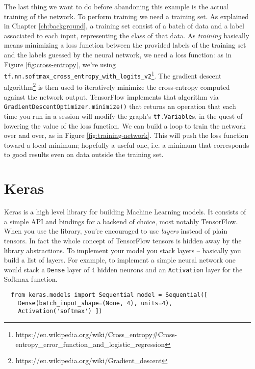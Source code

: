 The last thing we want to do before abandoning this example is the
actual training of the network. To perform training we need a training
set. As explained in Chapter \ref{ch:background}, a training set
consist of a batch of data and a label associated to each input,
representing the class of that data. As \emph{training} basically means
minimizing a loss function between the provided labels of the training
set and the labels guessed by the neural network, we need a loss
function: as in Figure \ref{fig:cross-entropy}, we're using
\texttt{tf.nn.softmax\_cross\_entropy\_with\_logits\_v2}\footnote{https://en.wikipedia.org/wiki/Cross\_entropy\#Cross-entropy\_error\_function\_and\_logistic\_regression}.
The gradient descent
algorithm\footnote{https://en.wikipedia.org/wiki/Gradient\_descent} is
then used to iteratively minimize the cross-entropy computed against
the network output. TensorFlow implements that algorithm via
\texttt{GradientDescentOptimizer.minimize()} that returns an operation
that each time you run in a session will modify the graph's
\texttt{tf.Variable}s, in the quest of lowering the value of the loss
function. We can build a loop to train the network over and over, as in
Figure \ref{fig:training-network}. This will push the loss function
toward a local minimum; hopefully a useful one, i.e. a minimum that
corresponds to good results even on data outside the training set.

\section{Keras}
\label{sec:keras}

Keras is a high level library for building Machine Learning
models. It consists of a simple API and bindings for a
backend of choice, most notably TensorFlow. When you use the
library, you're encouraged to use \emph{layers} instead of
plain tensors. In fact the whole concept of TensorFlow
tensors is hidden away by the library abstractions. To
implement your model you stack layers -- basically you build
a list of layers. For example, to implement a simple neural
network one would stack a \texttt{Dense} layer of 4 hidden
neurons and an \texttt{Activation} layer for the Softmax
function.

\begin{verbatim}
  from keras.models import Sequential model = Sequential([
    Dense(batch_input_shape=(None, 4), units=4),
    Activation('softmax') ])
\end{verbatim}

